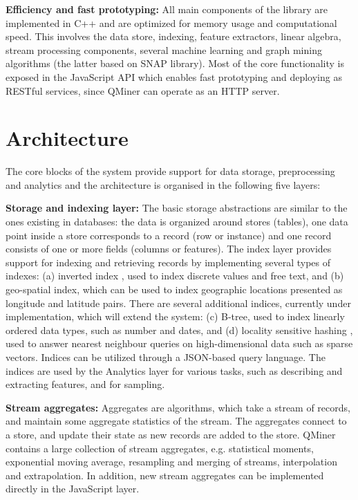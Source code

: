 \documentclass{article} %
\begin{document}
\textbf{Efficiency and fast prototyping:} All main components of the library are implemented in C++ and are optimized for memory usage and computational speed. This involves the data store, indexing, feature extractors, linear algebra, stream processing components, several machine learning and graph mining algorithms (the latter based on SNAP library). Most of the core functionality is exposed in the JavaScript API which enables fast prototyping and deploying as RESTful services, since QMiner can operate as an HTTP server.



\section{Architecture}
\label{sec:architecture}

The core blocks of the system provide support for data storage, preprocessing and analytics and the architecture is organised in the following five layers:

\textbf{Storage and indexing layer:} The basic storage abstractions are similar to the ones existing in databases: the data is organized around stores (tables), one data point inside a store corresponds to a record (row or instance) and one record consists of one or more fields (columns or features). The index layer provides support for indexing and retrieving records by implementing several types of indexes: (a) inverted index \cite[section 6.5]{knuth1998taocp3}, used to index discrete values and free text, and (b) geo-spatial index, which can be used to index geographic locations presented as longitude and latitude pairs. There are several additional indices, currently under implementation, which will extend the system: (c) B-tree, used to index linearly ordered data types, such as number and dates, and (d) locality sensitive hashing \cite{har2012approximate}, used to answer nearest neighbour queries on high-dimensional data such as sparse vectors. Indices can be utilized through a JSON-based query language. The indices are used by the Analytics layer for various tasks, such as describing and extracting features, and for sampling.

\textbf{Stream aggregates:} Aggregates are algorithms, which take a stream of records, and maintain some aggregate statistics of the stream. The aggregates connect to a store, and update their state as new records are added to the store. QMiner contains a large collection of stream aggregates, e.g. statistical moments, exponential moving average, resampling and merging of streams, interpolation and extrapolation. In addition, new stream aggregates can be implemented directly in the JavaScript layer.
\end{document}

